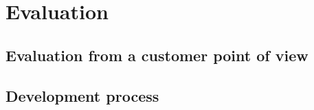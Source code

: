 \section{Evaluation}
\subsection{Evaluation from a customer point of view}
\subsection{Development process}
